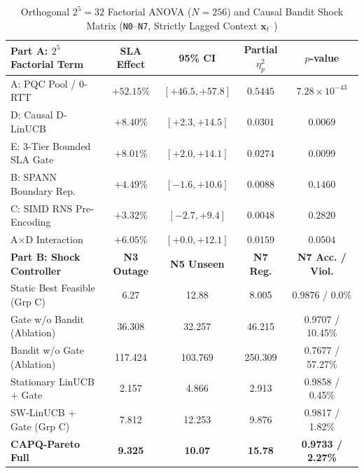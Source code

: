 \documentclass[10pt,journal,compsoc]{IEEEtran}
\begin{document}
\begin{table}[!t]
\centering
\caption{Orthogonal $2^5=32$ Factorial ANOVA ($N=256$) and Causal Bandit Shock Matrix (\texttt{N0}--\texttt{N7}, Strictly Lagged Context $\mathbf{x}_{t^-}$)}
\label{tab:v3_factorial_shock}
\setlength{\tabcolsep}{2.8pt}
\scriptsize
\begin{tabular}{@{}lcccc@{}}
\toprule
\textbf{Part A: $2^5$ Factorial Term} & \textbf{SLA Effect} & \textbf{95\% CI} & \textbf{Partial $\eta_p^2$} & \textbf{$p$-value} \\
\midrule
A: PQC Pool / 0-RTT        & $+52.15\%$ & $[+46.5, +57.8]$ & $0.5445$ & $7.28\!\times\!10^{-43}$ \\
D: Causal D-LinUCB         & $+8.40\%$  & $[+2.3, +14.5]$  & $0.0301$ & $0.0069$ \\
E: 3-Tier Bounded SLA Gate & $+8.01\%$  & $[+2.0, +14.1]$  & $0.0274$ & $0.0099$ \\
B: SPANN Boundary Rep.     & $+4.49\%$  & $[-1.6, +10.6]$  & $0.0088$ & $0.1460$ \\
C: SIMD RNS Pre-Encoding   & $+3.32\%$  & $[-2.7, +9.4]$   & $0.0048$ & $0.2820$ \\
A$\times$D Interaction     & $+6.05\%$  & $[+0.0, +12.1]$  & $0.0159$ & $0.0504$ \\
\midrule
\textbf{Part B: Shock Controller} & \textbf{N3 Outage} & \textbf{N5 Unseen} & \textbf{N7 Reg.} & \textbf{N7 Acc. / Viol.} \\
\midrule
Static Best Feasible (Grp C) & 6.27 & 12.88 & 8.005 & 0.9876 / 0.0\% \\
Gate w/o Bandit (Ablation) & 36.308 & 32.257 & 46.215 & 0.9707 / 10.45\% \\
Bandit w/o Gate (Ablation) & 117.424 & 103.769 & 250.309 & 0.7677 / 57.27\% \\
Stationary LinUCB + Gate & 2.157 & 4.866 & 2.913 & 0.9858 / 0.45\% \\
SW-LinUCB + Gate (Grp C) & 7.812 & 12.253 & 9.876 & 0.9817 / 1.82\% \\
\textbf{CAPQ-Pareto Full} & \textbf{9.325} & \textbf{10.07} & \textbf{15.78} & \textbf{0.9733 / 2.27\%} \\
\bottomrule
\end{tabular}
\end{table}
\end{document}
